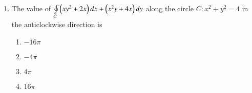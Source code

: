 \documentclass[journal,12pt,twocolumn]{IEEEtran}
\theoremstyle{remark}
\begin{document}
\begin{enumerate}
    \item The value of $\oint\limits_{C}\left(xy^2+2x\right)dx+\left(x^2y+4x\right)dy$ along the circle $C:x^2+y^2=4$ in the anticlockwise direction is
        \begin{enumerate}
            \item $-16\pi$
            \item $-4\pi$
            \item $4\pi$
            \item $16\pi$
        \end{enumerate}

\end{enumerate}
\end{document}
